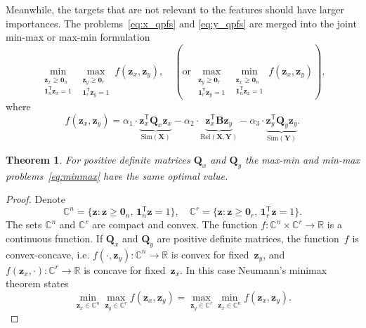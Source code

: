 \documentclass[12pt,twoside]{article}
\newtheorem{theorem}{Theorem}
\theoremstyle{definition}
\newcommand{\bz}{\mathbf{z}}
\newcommand{\bY}{\mathbf{Y}}
\newcommand{\bX}{\mathbf{X}}
\newcommand{\bB}{\mathbf{B}}
\newcommand{\bQ}{\mathbf{Q}}
\newcommand{\bbR}{\mathbb{R}}
\newcommand{\T}{\mathsf{T}}
\newcommand{\bOne}{\boldsymbol{1}}
\newcommand{\bZero}{\boldsymbol{0}}
\begin{document}
Meanwhile, the targets that are not relevant to the features should have larger importances.
The problems~\eqref{eq:x_qpfs} and \eqref{eq:y_qpfs} are merged into the joint min-max or max-min formulation
\begin{equation}
\min_{\substack{\bz_x \geq \bZero_n \\ \bOne_n^{\T}\bz_x=1}} 	\max_{\substack{\bz_y \geq \bZero_r \\ \bOne_r^{\T}\bz_y=1}} f(\bz_x, \bz_y), \quad \left(\text {or} \, \max_{\substack{\bz_y \geq \bZero_r \\ \bOne_r^{\T}\bz_y=1}} \min_{\substack{\bz_x \geq \bZero_n \\ \bOne_n^{\T}\bz_x=1}} f(\bz_x, \bz_y)\right),
\label{eq:minmax}
\end{equation}
where
\begin{equation*}
f(\bz_x, \bz_y) = \alpha_1 \cdot \underbrace{\bz_x^{\T} \bQ_x \bz_x}_{\text{Sim}(\bX)} - \alpha_2 \cdot \underbrace{\bz_x^{\T} \bB \bz_y}_{\text{Rel}(\bX, \bY)} - \alpha_3 \cdot \underbrace{\bz_y^{\T} \bQ_y \bz_y}_{\text{Sim}(\bY)}.
\end{equation*}
\begin{theorem}
	For positive definite matrices $\bQ_x$ and $\bQ_y$ the max-min and min-max problems~\eqref{eq:minmax} have the same optimal value.
\end{theorem}
\begin{proof}
	Denote
	\begin{equation*}
	\mathbb{C}^n = \{\bz : \bz \geq \bZero_n, \, \bOne_n^{\T}\bz=1\}, \quad \mathbb{C}^r = \{\bz : \bz \geq \bZero_r, \, \bOne_r^{\T}\bz=1\}.
	\end{equation*}
	The sets $\mathbb{C}^n$ and $\mathbb{C}^r$ are compact and convex. The function $f: \mathbb{C}^n \times \mathbb{C}^r \rightarrow \bbR$ is a continuous function. If $\bQ_x$ and $\bQ_y$ are positive definite matrices, the function~$f$ is convex-concave, i.e.
	$f(\cdot, \bz_y): \mathbb{C}^n \rightarrow \bbR$ is convex for fixed~$\bz_y$, and $f(\bz_x, \cdot): \mathbb{C}^r \rightarrow \bbR$ is concave for fixed~$\bz_x$.
	In this case Neumann's minimax theorem states
	\begin{equation*}
	\min_{\bz_x \in \mathbb{C}^n} \max_{\bz_y \in \mathbb{C}^r} f(\bz_x, \bz_y) = \max_{\bz_y \in \mathbb{C}^r} \min_{\bz_x\in \mathbb{C}^n} f(\bz_x, \bz_y).
	\end{equation*}
\end{proof}
\end{document}
